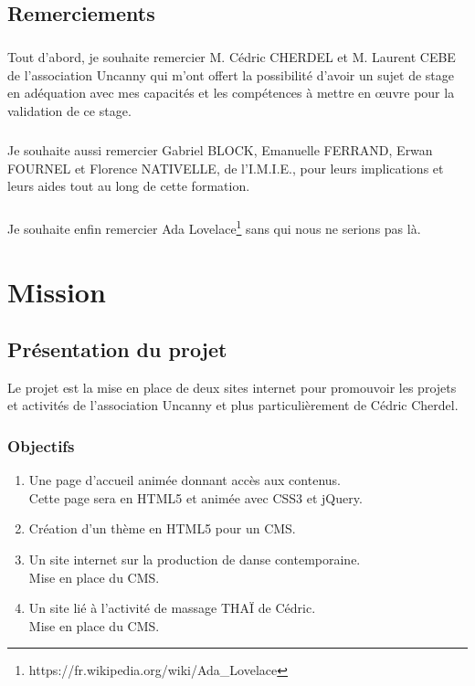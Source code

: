 \documentclass[11pt,a4paper]{report}
\begin{document}
	\section{Remerciements}
		\paragraph*{}Tout d'abord, je souhaite  remercier M. Cédric CHERDEL et M. Laurent CEBE de l'association Uncanny qui m'ont offert la possibilité d'avoir un sujet de stage en adéquation avec mes capacités et les compétences à mettre en œuvre pour la validation de ce stage.
		\paragraph*{}Je souhaite aussi remercier Gabriel BLOCK, Emanuelle FERRAND, Erwan FOURNEL et Florence \linebreak NATIVELLE, de l'I.M.I.E., pour leurs implications et leurs aides tout au long de cette formation.
		\paragraph*{}Je souhaite enfin remercier Ada Lovelace\footnote{https://fr.wikipedia.org/wiki/Ada\_Lovelace} sans qui nous ne serions pas là.

\chapter{Mission}
	\section{Présentation du projet}
		Le projet est la mise en place de deux sites internet pour promouvoir les projets et activités de l'association Uncanny et plus particulièrement de Cédric Cherdel. 
		\subsection{Objectifs}
			\begin{enumerate}
				\item Une page d'accueil animée donnant accès aux contenus.\\
				Cette page sera en HTML5 et animée avec CSS3 et jQuery.
				\item Création d'un thème en HTML5 pour un CMS.
				\item Un site internet sur la production de danse contemporaine.\\
				Mise en place du CMS.
				\item Un site lié à l'activité de massage THAÏ de Cédric.\\
				Mise en place du CMS.
			\end{enumerate}
\end{document}
